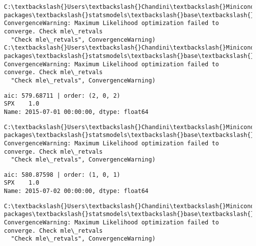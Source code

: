\documentclass[11pt]{article}
\begin{document}
    \begin{Verbatim}[commandchars=\\\{\}]
C:\textbackslash{}Users\textbackslash{}Chandini\textbackslash{}Miniconda3\textbackslash{}envs\textbackslash{}auquan\textbackslash{}lib\textbackslash{}site-packages\textbackslash{}statsmodels\textbackslash{}base\textbackslash{}model.py:496: ConvergenceWarning: Maximum Likelihood optimization failed to converge. Check mle\_retvals
  "Check mle\_retvals", ConvergenceWarning)
C:\textbackslash{}Users\textbackslash{}Chandini\textbackslash{}Miniconda3\textbackslash{}envs\textbackslash{}auquan\textbackslash{}lib\textbackslash{}site-packages\textbackslash{}statsmodels\textbackslash{}base\textbackslash{}model.py:496: ConvergenceWarning: Maximum Likelihood optimization failed to converge. Check mle\_retvals
  "Check mle\_retvals", ConvergenceWarning)

    \end{Verbatim}

    \begin{Verbatim}[commandchars=\\\{\}]
aic: 579.68711 | order: (2, 0, 2)
SPX    1.0
Name: 2015-07-01 00:00:00, dtype: float64

    \end{Verbatim}

    \begin{Verbatim}[commandchars=\\\{\}]
C:\textbackslash{}Users\textbackslash{}Chandini\textbackslash{}Miniconda3\textbackslash{}envs\textbackslash{}auquan\textbackslash{}lib\textbackslash{}site-packages\textbackslash{}statsmodels\textbackslash{}base\textbackslash{}model.py:496: ConvergenceWarning: Maximum Likelihood optimization failed to converge. Check mle\_retvals
  "Check mle\_retvals", ConvergenceWarning)

    \end{Verbatim}

    \begin{Verbatim}[commandchars=\\\{\}]
aic: 580.87598 | order: (1, 0, 1)
SPX    1.0
Name: 2015-07-02 00:00:00, dtype: float64

    \end{Verbatim}

    \begin{Verbatim}[commandchars=\\\{\}]
C:\textbackslash{}Users\textbackslash{}Chandini\textbackslash{}Miniconda3\textbackslash{}envs\textbackslash{}auquan\textbackslash{}lib\textbackslash{}site-packages\textbackslash{}statsmodels\textbackslash{}base\textbackslash{}model.py:496: ConvergenceWarning: Maximum Likelihood optimization failed to converge. Check mle\_retvals
  "Check mle\_retvals", ConvergenceWarning)

    \end{Verbatim}
\end{document}
